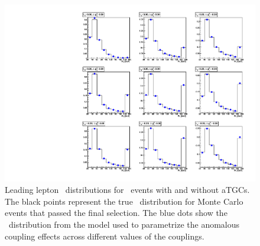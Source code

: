 \begin{figure}[tp]
  \centerline{
    \includegraphics[width=1.0\textwidth]{figures/pdfs}
  }

  \caption[PDF parameterization] {Leading lepton \pt\ distributions
  for \ww\ events with and without aTGCs. The black points represent the
  true \pt\ distribution for Monte Carlo events that passed the final
  selection. The blue dots show the \pt\ distribution from the model used to
  parametrize the anomalous coupling effects across different values
  of the couplings.}
\label{fig:pdfs}
\end{figure}

